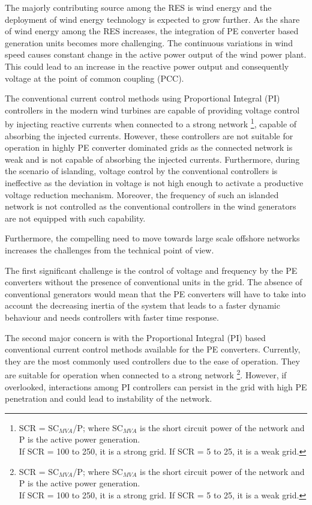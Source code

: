 The majorly contributing source among the \gls{RES} is wind energy and the deployment of wind energy technology is expected to grow further. As the share of wind energy among the \gls{RES} increases, the integration of \gls{PE} converter based generation units becomes more challenging. The continuous variations in wind speed causes constant change in the active power output of the wind power plant. This could lead to an increase in the reactive power output and consequently voltage at the point of common coupling (\gls{PCC}). 

The conventional current control methods using Proportional Integral (\gls{PI}) controllers in the modern wind turbines are capable of providing voltage control by injecting reactive currents when connected to a strong network \footnote{SCR = SC$_{MVA}$/P;\; where SC$_{MVA}$ is the short circuit power of the network and P is the active power generation. \\
If SCR = 100 to 250, it is a strong grid. If SCR = 5 to 25, it is a weak grid.}, capable of absorbing the injected currents. However, these controllers are not suitable for operation in highly \gls{PE} converter dominated grids as the connected network is weak and is not capable of absorbing the injected currents. Furthermore, during the scenario of islanding, voltage control by the conventional controllers is ineffective as the deviation in voltage is not high enough to activate a productive voltage reduction mechanism. Moreover, the frequency of such an islanded network is not controlled as the conventional controllers in the wind generators are not equipped with such capability.  

       

Furthermore, the compelling need to move towards large scale offshore networks increases the challenges from the technical point of view.


The first significant challenge is the control of voltage and frequency by the \gls{PE} converters without the presence of conventional units in the grid. The absence of conventional generators would mean that the \gls{PE} converters will have to take into account the decreasing inertia of the system that leads to a faster dynamic behaviour and needs controllers with faster time response. 

The second major concern is with the Proportional Integral (\gls{PI}) based conventional current control methods available for the \gls{PE} converters. Currently, they are the most commonly used controllers due to the ease of operation. They are suitable for operation when connected to a strong network \footnote{SCR = SC$_{MVA}$/P;\; where SC$_{MVA}$ is the short circuit power of the network and P is the active power generation. \\
If SCR = 100 to 250, it is a strong grid. If SCR = 5 to 25, it is a weak grid.}. However, if overlooked, interactions among \gls{PI} controllers can persist in the grid with high \gls{PE} penetration and could lead to instability of the network.


